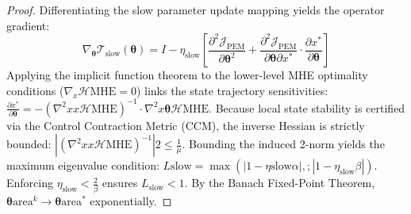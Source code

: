 \documentclass[10pt,journal,compsoc]{IEEEtran}
\begin{document}
\begin{proof}
Differentiating the slow parameter update mapping yields the operator gradient:
\begin{equation}
    \nabla_{\bm{\theta}} \mathcal{T}_{\text{slow}}(\bm{\theta}) = I - \eta_{\text{slow}} \left[ \frac{\partial^2 \mathcal{J}_{\text{PEM}}}{\partial \bm{\theta}^2} + \frac{\partial^2 \mathcal{J}_{\text{PEM}}}{\partial \bm{\theta} \partial x^*} \cdot \frac{\partial x^*}{\partial \bm{\theta}} \right]
\end{equation}
Applying the implicit function theorem to the lower-level MHE optimality conditions ($\nabla_x \mathcal{H}{\text{MHE}} = 0$) links the state trajectory sensitivities: $\frac{\partial x^*}{\partial \bm{\theta}} = - \left( \nabla^2{xx} \mathcal{H}{\text{MHE}} \right)^{-1} \cdot \nabla^2{x\bm{\theta}} \mathcal{H}{\text{MHE}}$. Because local state stability is certified via the Control Contraction Metric (CCM), the inverse Hessian is strictly bounded: $|(\nabla^2{xx} \mathcal{H}{\text{MHE}})^{-1}|2 \le \frac{1}{\mu}$. Bounding the induced 2-norm yields the maximum eigenvalue condition: $L{\text{slow}} = \max\left( |1 - \eta{\text{slow}} \alpha|, ; |1 - \eta_{\text{slow}} \beta| \right)$. Enforcing $\eta_{\text{slow}} < \frac{2}{\beta}$ ensures $L_{\text{slow}} < 1$. By the Banach Fixed-Point Theorem, $\bm{\theta}{\text{area}}^k \rightarrow \bm{\theta}{\text{area}}^*$ exponentially.
\end{proof}
\end{document}
